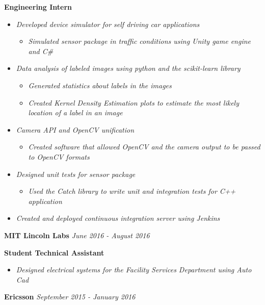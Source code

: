 \documentclass[8pt]{extarticle}
\begin{document}
{\tiny }
\textbf{Engineering Intern} 
\begin{itemize}
\item \textit{Developed device simulator for self driving car applications}
\begin{itemize}
\item \textit{Simulated sensor package in traffic conditions using Unity game engine and C\#}
\end{itemize}
\item \textit{Data analysis of labeled images using python and the scikit-learn library}
\begin{itemize}
\item \textit{Generated statistics about labels in the images}
\item \textit{Created Kernel Density Estimation plots to estimate the most likely location of a label in an image}
\end{itemize}
\item \textit{Camera API and OpenCV unification}
\begin{itemize}
\item \textit{Created software that allowed OpenCV and the camera output to be passed to OpenCV formats}
\end{itemize}
\item \textit{Designed unit tests for sensor package}
\begin{itemize}
\item \textit{Used the Catch library to write unit and integration tests for C++ application}
\end{itemize}
\item \textit{Created and deployed continuous integration server using Jenkins}
\end{itemize}
\textbf{MIT Lincoln Labs} \textit{June  2016 - August 2016}

\textbf{Student Technical Assistant } 
\begin{itemize}
\item \textit{Designed electrical systems for the Facility Services Department using Auto Cad}
\end{itemize}
\textbf{Ericsson} \textit{September  2015 - January 2016}
\end{document}

